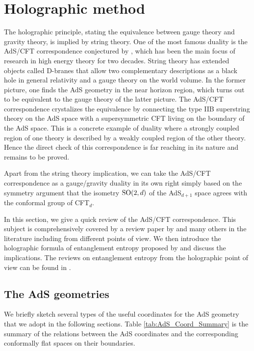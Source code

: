 \section{Holographic method}\label{ss:Holography}

The holographic principle, stating the equivalence between gauge theory and gravity theory, is implied by string theory.
One of the most famous duality is the AdS/CFT correspondence conjectured
by \textcite{Maldacena:1997re}, which has been the main focus of research in
high energy theory for two decades.
String theory has extended objects called D-branes that allow two complementary descriptions as a black hole in general relativity and a gauge theory on the world volume.
In the former picture, one finds the AdS geometry in the near horizon region, which turns out to be equivalent to the gauge theory of the latter picture.
The AdS/CFT correspondence crystalizes the equivalence by connecting the type IIB superstring theory on the AdS space with a supersymmetric CFT
living on the boundary of the AdS space.
This is a concrete example of duality where a strongly coupled region of one theory is described by a weakly coupled region of the other theory.
Hence the direct check of this correspondence is far reaching in its nature and remains to be proved.

Apart from the string theory implication, we can take the AdS/CFT correspondence 
as a gauge/gravity duality in its own right simply based on the symmetry argument that the isometry $\mathrm{SO}(2,d)$ of the AdS$_{d+1}$ space agrees with 
the conformal group of CFT$_d$.

In this section, we give a quick review of the AdS/CFT
correspondence. 
This subject is comprehensively covered by a review paper by
\textcite{Aharony:1999ti} and many others in the literature including \textcite{Klebanov:2000me,McGreevy:2009xe} from different points of view.
We then introduce the holographic formula of entanglement entropy proposed by \textcite{Ryu:2006bv,Ryu:2006ef} and discuss the implications.
The reviews on entanglement entropy from the holographic point of view can be found in \textcite{Nishioka:2009un,Takayanagi:2012kg,Rangamani:2016dms}.


\subsection{The AdS geometries}

We briefly sketch several types of the useful coordinates for the AdS geometry that we adopt in the following sections.
Table \ref{tab:AdS_Coord_Summary} is the summary of the relations between the AdS coordinates and the corresponding conformally flat spaces on their boundaries.

